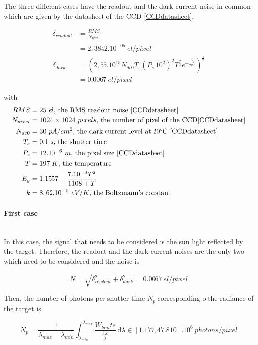 The three different cases have the readout and the dark current noise in common which are given by the datasheet of the CCD \ref{CCDdatasheet}.

\begin{align}
\delta_{readout} & = \frac{RMS}{N_{pixel}} \\
& = 2,3842.10^{-05} \ el/pixel \label{eq:readout} \\
\delta_{dark} & = \left(2,55.10^{15}N_{dc0}T_s(P_s.10^2)^2T^{\frac{2}{3}}e^{-\frac{E_g}{2kT}}\right)^{\frac{1}{2}} \\
& = 0.0067 \ el/pixel \label{eq:darkcurrent}
\end{align}

with
\begin{align*}
RMS & = 25\ el\mbox{, the RMS readout noise \ref{CCDdatasheet}}\\
N_{pixel} & = 1024\times 1024 \ pixels\mbox{, the number of pixel of the CCD\ref{CCDdatasheet}}\\
N_{dc0} & = 30\ pA/cm^2\mbox{, the dark current level at 20\textdegree C \ref{CCDdatasheet}}\\
T_s & = 0.1\ s\mbox{, the shutter time}\\
P_s & = 12.10^{-6}\ m\mbox{, the  pixel size \ref{CCDdatasheet}}\\
T & = 197\ K\mbox{, the temperature}\\
E_g & = 1.1557-\frac{7.10^{-4}T^2}{1108+T}\\
k & = 8,62.10^{-5}\ eV/K\mbox{, the Boltzmann's constant}
\end{align*}


\paragraph*{First case}
\label{first case}
~~\\
In this case, the signal that needs to be considered is the sun light reflected by the target. Therefore, the readout and the dark current noises are the only two which need to be considered and the noise is

\begin{equation}
\label{eq:Noise case1}
N = \sqrt{\delta_{readout}^2+\delta_{dark}^2} = 0.0067\ el/pixel
\end{equation}

Then, the number of photons per shutter time $N_p$ corresponding o the radiance of the target is

\begin{equation}
\label{eq:Number Photons per Shutter Time case1}
N_p = \frac{1}{\lambda_{max}-\lambda_{min}}\int_{\lambda_{min}}^{\lambda_{max}} \frac{W_{lum}ts}{\frac{h.c}{\lambda}} \, \mathrm d\lambda \in [1.177, 47.810].10^{6} \ photons/pixel
\end{equation}

